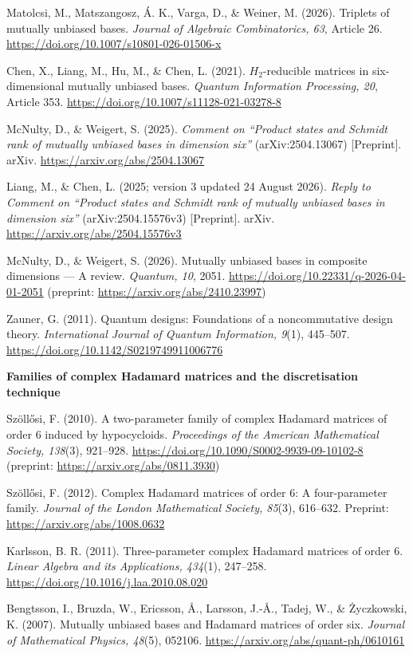 \documentclass[
  11pt,
]{article}
\begin{document}
Matolcsi, M., Matszangosz, Á. K., Varga, D., \& Weiner, M. (2026).
Triplets of mutually unbiased bases. \emph{Journal of Algebraic
Combinatorics, 63}, Article 26.
\url{https://doi.org/10.1007/s10801-026-01506-x}

Chen, X., Liang, M., Hu, M., \& Chen, L. (2021). \(H_2\)-reducible
matrices in six-dimensional mutually unbiased bases. \emph{Quantum
Information Processing, 20}, Article 353.
\url{https://doi.org/10.1007/s11128-021-03278-8}

McNulty, D., \& Weigert, S. (2025). \emph{Comment on ``Product states
and Schmidt rank of mutually unbiased bases in dimension six''}
(arXiv:2504.13067) {[}Preprint{]}. arXiv.
\url{https://arxiv.org/abs/2504.13067}

Liang, M., \& Chen, L. (2025; version 3 updated 24 August 2026).
\emph{Reply to Comment on ``Product states and Schmidt rank of mutually
unbiased bases in dimension six''} (arXiv:2504.15576v3) {[}Preprint{]}.
arXiv. \url{https://arxiv.org/abs/2504.15576v3}

McNulty, D., \& Weigert, S. (2026). Mutually unbiased bases in composite
dimensions --- A review. \emph{Quantum, 10}, 2051.
\url{https://doi.org/10.22331/q-2026-04-01-2051} (preprint:
\url{https://arxiv.org/abs/2410.23997})

Zauner, G. (2011). Quantum designs: Foundations of a noncommutative
design theory. \emph{International Journal of Quantum Information,
9}(1), 445--507. \url{https://doi.org/10.1142/S0219749911006776}

\textbf{Families of complex Hadamard matrices and the discretisation
technique}

Szöllősi, F. (2010). A two-parameter family of complex Hadamard matrices
of order 6 induced by hypocycloids. \emph{Proceedings of the American
Mathematical Society, 138}(3), 921--928.
\url{https://doi.org/10.1090/S0002-9939-09-10102-8} (preprint:
\url{https://arxiv.org/abs/0811.3930})

Szöllősi, F. (2012). Complex Hadamard matrices of order 6: A
four-parameter family. \emph{Journal of the London Mathematical Society,
85}(3), 616--632. Preprint: \url{https://arxiv.org/abs/1008.0632}

Karlsson, B. R. (2011). Three-parameter complex Hadamard matrices of
order 6. \emph{Linear Algebra and its Applications, 434}(1), 247--258.
\url{https://doi.org/10.1016/j.laa.2010.08.020}

Bengtsson, I., Bruzda, W., Ericsson, Å., Larsson, J.-Å., Tadej, W., \&
Życzkowski, K. (2007). Mutually unbiased bases and Hadamard matrices of
order six. \emph{Journal of Mathematical Physics, 48}(5), 052106.
\url{https://arxiv.org/abs/quant-ph/0610161}
\end{document}
